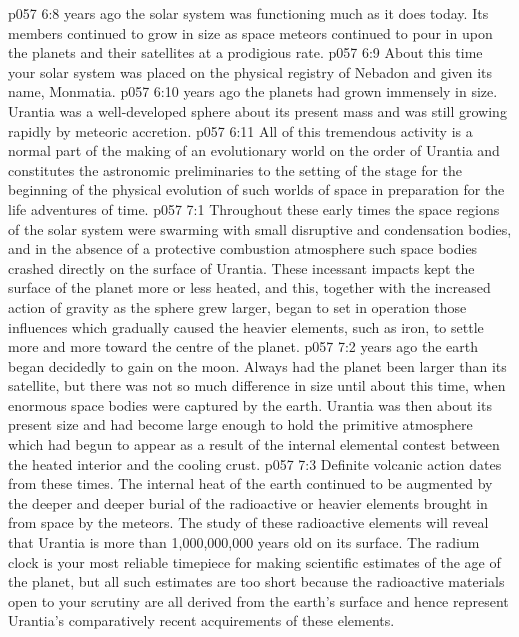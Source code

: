 \vs p057 6:8 \pc {} years ago the solar system was functioning much as it does today. Its members continued to grow in size as space meteors continued to pour in upon the planets and their satellites at a prodigious rate.
\vs p057 6:9 About this time your solar system was placed on the physical registry of Nebadon and given its name, Monmatia.
\vs p057 6:10 \pc {} years ago the planets had grown immensely in size. Urantia was a well\hyp{}developed sphere about  its present mass and was still growing rapidly by meteoric accretion.
\vs p057 6:11 All of this tremendous activity is a normal part of the making of an evolutionary world on the order of Urantia and constitutes the astronomic preliminaries to the setting of the stage for the beginning of the physical evolution of such worlds of space in preparation for the life adventures of time.
\vs p057 7:1 Throughout these early times the space regions of the solar system were swarming with small disruptive and condensation bodies, and in the absence of a protective combustion atmosphere such space bodies crashed directly on the surface of Urantia. These incessant impacts kept the surface of the planet more or less heated, and this, together with the increased action of gravity as the sphere grew larger, began to set in operation those influences which gradually caused the heavier elements, such as iron, to settle more and more toward the centre of the planet.
\vs p057 7:2 \pc {} years ago the earth began decidedly to gain on the moon. Always had the planet been larger than its satellite, but there was not so much difference in size until about this time, when enormous space bodies were captured by the earth. Urantia was then about  its present size and had become large enough to hold the primitive atmosphere which had begun to appear as a result of the internal elemental contest between the heated interior and the cooling crust.
\vs p057 7:3 Definite volcanic action dates from these times. The internal heat of the earth continued to be augmented by the deeper and deeper burial of the radioactive or heavier elements brought in from space by the meteors. The study of these radioactive elements will reveal that Urantia is more than 1,000,000,000 years old on its surface. The radium clock is your most reliable timepiece for making scientific estimates of the age of the planet, but all such estimates are too short because the radioactive materials open to your scrutiny are all derived from the earth’s surface and hence represent Urantia’s comparatively recent acquirements of these elements.
